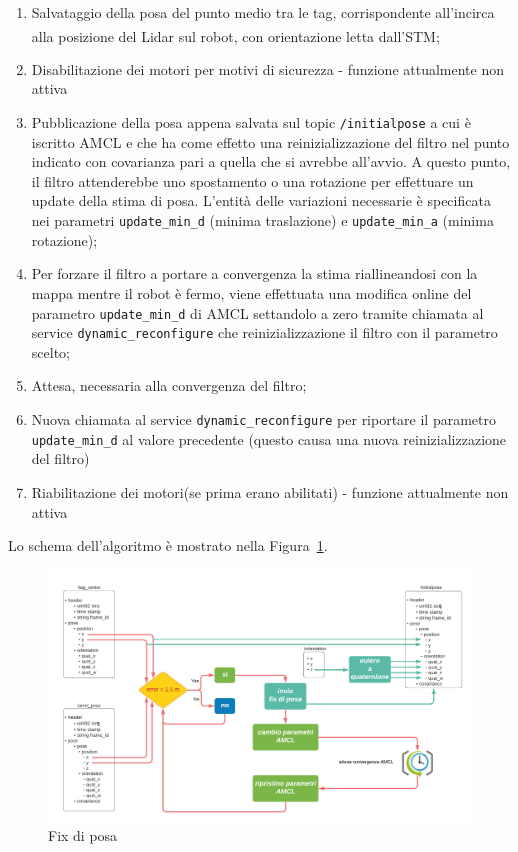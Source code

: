 \begin{enumerate}
    \item Salvataggio della posa del punto medio tra le tag, corrispondente all'incirca alla posizione del Lidar sul robot, con orientazione letta dall'STM\textsuperscript\textregistered; 
    \item Disabilitazione dei motori per motivi di sicurezza - funzione attualmente non attiva
    \item Pubblicazione della posa appena salvata sul topic \texttt{/initialpose} a cui è iscritto AMCL e che ha come effetto una reinizializzazione del filtro nel punto indicato con covarianza pari a quella che si avrebbe all'avvio. A questo punto, il filtro attenderebbe uno spostamento o una rotazione per effettuare un update della stima di posa. L'entità delle variazioni necessarie è specificata nei parametri \texttt{update\_min\_d} (minima traslazione) e \texttt{update\_min\_a} (minima rotazione);
    \item Per forzare il filtro a portare a convergenza la stima riallineandosi con la mappa mentre il robot è fermo, viene effettuata una modifica online del parametro \texttt{update\_min\_d} di AMCL settandolo a zero tramite chiamata al service \texttt{dynamic\_reconfigure} che reinizializzazione il filtro con il parametro scelto;
    \item Attesa, necessaria alla convergenza del filtro;
    \item Nuova chiamata al service \texttt{dynamic\_reconfigure} per riportare il parametro \texttt{update\_min\_d} al valore precedente (questo causa una nuova reinizializzazione del filtro)
    \item Riabilitazione dei motori(se prima erano abilitati) - funzione attualmente non attiva

\end{enumerate}
Lo schema dell'algoritmo è mostrato nella Figura~\ref{fig:fix_posa}.

\begin{figure}[h] 
\centering    
\includegraphics[width=1\textwidth]{Capitolo2/Figs/schema_fix_posa.pdf}
\caption[Fix di posa]{Fix di posa}
\label{fig:fix_posa}
\end{figure}


